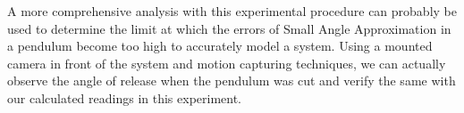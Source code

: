 A more comprehensive analysis with this experimental procedure can probably be used to determine the limit at which the errors of Small Angle Approximation in a pendulum become too high to accurately model a system. Using a mounted camera in front of the system and motion capturing techniques, we can actually observe the angle of release when the pendulum was cut and verify the same with our calculated readings in this experiment.